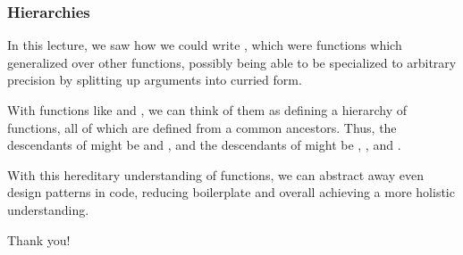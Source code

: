 \documentclass[aspectratio=169]{beamer}
\begin{document}
\begin{frame}[fragile]
  \frametitle{Hierarchies}

  In this lecture, we saw how we could write , which were
  functions which generalized over other functions, possibly being able to be specialized
  to arbitrary precision by splitting up arguments into curried form.

  With functions like  and , we can think of them as defining
  a hierarchy of functions, all of which are defined from a common ancestors. Thus, the
  descendants of  might be  and , 
  and the descendants of  might be , , and .

  With this hereditary understanding of functions, we can abstract away even design patterns
  in code, reducing boilerplate and overall achieving a more holistic understanding.
\end{frame}

\begin{frame}[plain]
	\begin{center} Thank you! \end{center}
\end{frame}
\end{document}
